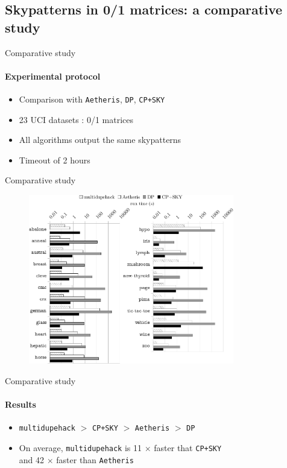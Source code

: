 \documentclass{beamer}
\newcommand{\mdh}{\texttt{multi\-dupe\-hack}}
\newcommand{\aeth}{\texttt{Aetheris}}
\newcommand{\domp}{\texttt{DP}}
\newcommand{\cpsky}{\texttt{CP+SKY}}
\begin{document}
\subsection{Skypatterns in 0/1 matrices: a comparative study}

\begin{frame}{Comparative study}
\framesubtitle{Experimental protocol}
  \begin{itemize}
      \item Comparison with \aeth{}, \domp{}, \cpsky{} 
      \item 23 UCI datasets : 0/1 matrices
      \item All algorithms output the same skypatterns
      \item Timeout of 2 hours
  \end{itemize}
\end{frame}

\begin{frame}{Comparative study}
  \begin{figure}[htp]
  \centering
  \includegraphics[width=0.8\textwidth]{uci-histo-split.pdf}
  \end{figure}
\end{frame}

\begin{frame}{Comparative study}
\framesubtitle{Results}
  \begin{itemize}
      \item \mdh{} $>$ \cpsky{} $>$ \aeth{} $>$ \domp{}  
      \item On average, \mdh{} is 11 $\times$ faster that \cpsky{}\\ and 42 $\times$ faster than \aeth{}
     \end{itemize}
\end{frame}
\end{document}
